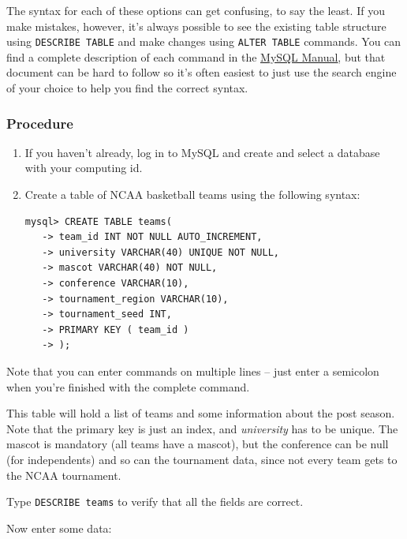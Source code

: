 \documentclass[11pt]{article} %
\begin{document}
The syntax for each of these options can get confusing, to say the least. If you make mistakes, however, it’s always possible to see the existing table structure using \verb|DESCRIBE TABLE| and make changes using \verb|ALTER TABLE| commands. You can find a complete description of each command in the \href{https://dev.mysql.com/doc/refman/5.7/en/}{\underline{MySQL Manual}}, but that document can be hard to follow so it’s often easiest to just use the search engine of your choice to help you find the correct syntax.

\subsubsection*{Procedure}

\begin{enumerate}
\item If you haven’t already, log in to MySQL and create and select a database with your computing id.
\item Create a table of NCAA basketball teams using the following syntax:

\begin{verbatim}
mysql> CREATE TABLE teams(
   -> team_id INT NOT NULL AUTO_INCREMENT,
   -> university VARCHAR(40) UNIQUE NOT NULL,
   -> mascot VARCHAR(40) NOT NULL,
   -> conference VARCHAR(10),
   -> tournament_region VARCHAR(10),
   -> tournament_seed INT,
   -> PRIMARY KEY ( team_id )
   -> );
\end{verbatim}
\end{enumerate}

Note that you can enter commands on multiple lines -- just enter a semicolon when you’re finished with the complete command.

This table will hold a list of teams and some information about the post season. Note that the primary key is just an index, and \emph{university} has to be unique. The mascot is mandatory (all teams have a mascot), but the conference can be null (for independents) and so can the tournament data, since not every team gets to the NCAA tournament.

Type \verb|DESCRIBE teams| to verify that all the fields are correct.

Now enter some data:
\end{document}
